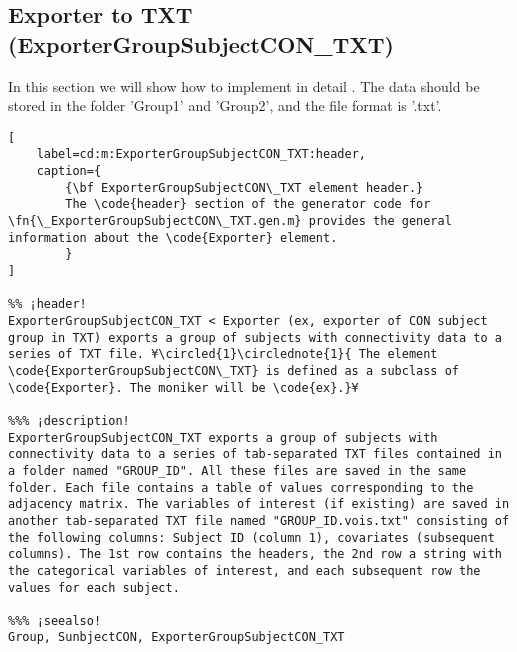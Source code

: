 \documentclass{tufte-handout}
\begin{document}
\subsection{Exporter to TXT (ExporterGroupSubjectCON\_TXT)}

In this section we will show how to implement in detail . The data should be stored in the folder 'Group1' and 'Group2', and the file format is '.txt'.

\begin{lstlisting}[
	label=cd:m:ExporterGroupSubjectCON_TXT:header,
	caption={
		{\bf ExporterGroupSubjectCON\_TXT element header.}
		The \code{header} section of the generator code for \fn{\_ExporterGroupSubjectCON\_TXT.gen.m} provides the general information about the \code{Exporter} element.
		}
]

%% ¡header!
ExporterGroupSubjectCON_TXT < Exporter (ex, exporter of CON subject group in TXT) exports a group of subjects with connectivity data to a series of TXT file. ¥\circled{1}\circlednote{1}{ The element \code{ExporterGroupSubjectCON\_TXT} is defined as a subclass of \code{Exporter}. The moniker will be \code{ex}.}¥

%%% ¡description!
ExporterGroupSubjectCON_TXT exports a group of subjects with connectivity data to a series of tab-separated TXT files contained in a folder named "GROUP_ID". All these files are saved in the same folder. Each file contains a table of values corresponding to the adjacency matrix. The variables of interest (if existing) are saved in another tab-separated TXT file named "GROUP_ID.vois.txt" consisting of the following columns: Subject ID (column 1), covariates (subsequent columns). The 1st row contains the headers, the 2nd row a string with the categorical variables of interest, and each subsequent row the values for each subject.

%%% ¡seealso!
Group, SunbjectCON, ExporterGroupSubjectCON_TXT
\end{lstlisting}
\end{document}
